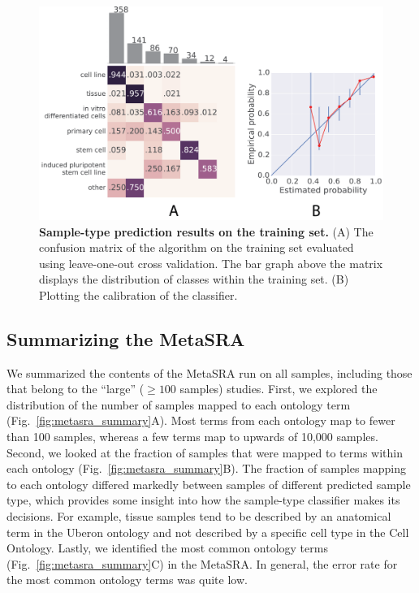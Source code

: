\begin{figure}[htbp]
\centering
\includegraphics[width=13cm]{figures/sample_type_training_set.png} 
\caption{\textbf{Sample-type prediction results on the training set.} (A) The confusion matrix of the algorithm on the training set evaluated using leave-one-out cross validation. The bar graph above the matrix displays the distribution of classes within the training set. (B) Plotting the calibration of the classifier.}
\label{fig:train_set}
\end{figure}


\subsection{Summarizing the MetaSRA}\label{sec:sum_metasra}

We summarized the contents of the MetaSRA run on all samples, including those that belong to the ``large'' ($\geq 100$ samples) studies.  First, we explored the distribution of the number of samples mapped to each ontology term (Fig.~\ref{fig:metasra_summary}A).  Most terms from each ontology map to fewer than 100 samples, whereas a few terms map to upwards of 10,000 samples.  Second, we looked at the fraction of samples that were mapped to terms within each ontology (Fig.~\ref{fig:metasra_summary}B).  The fraction of samples mapping to each ontology differed markedly between samples of different predicted sample type, which provides some insight into how the sample-type classifier makes its decisions.  For example, tissue samples tend to be described by an anatomical term in the Uberon ontology and not described by a specific cell type in the Cell Ontology. 
Lastly, we identified the most common ontology terms (Fig.~\ref{fig:metasra_summary}C) 
in the MetaSRA.  In general, the error rate for the most common ontology terms was quite low.

